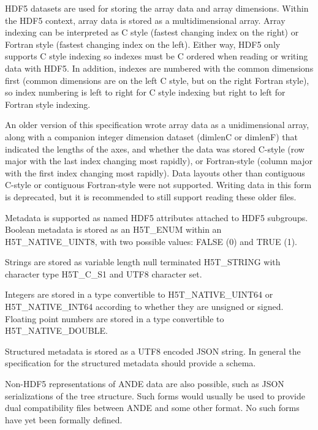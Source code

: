 \documentclass{article}
\begin{document}
HDF5 datasets are used for storing the array data and array dimensions. Within the HDF5 context, array data is stored as a multidimensional array. Array indexing can be interpreted as C style (fastest changing index on the right) or Fortran style (fastest changing index on the left). Either way, HDF5 only supports C style indexing so indexes must be C ordered when reading or writing data with HDF5. In addition, indexes are numbered with the common dimensions first (common dimensions are on the left C style, but on the right Fortran style), so index numbering is left to right for C style indexing but right to left for Fortran style indexing.  

An older version of this specification wrote array data as a unidimensional array, along with a companion integer dimension dataset (dimlenC or dimlenF) that indicated the lengths of the axes, and whether the data was stored C-style (row major with the last index changing most rapidly), or Fortran-style (column major with the first index changing most rapidly). Data layouts other than contiguous C-style or contiguous Fortran-style were not supported. Writing data in this form is deprecated, but it is recommended to still support reading these older files.  

Metadata is supported as named HDF5 attributes attached to HDF5 subgroups.
Boolean metadata is stored as an H5T\_ENUM within an H5T\_NATIVE\_UINT8, with two possible values: FALSE (0) and TRUE (1).

Strings are stored as variable length null terminated H5T\_STRING with character type H5T\_C\_S1 and UTF8 character set.

Integers are stored in a type convertible to H5T\_NATIVE\_UINT64 or H5T\_NATIVE\_INT64 according to whether they are unsigned or signed. Floating point numbers are stored in a type convertible to H5T\_NATIVE\_DOUBLE.

Structured metadata is stored as a UTF8 encoded JSON string. In general the specification for the structured metadata should provide a schema. 

Non-HDF5 representations of ANDE data are also possible, such as JSON serializations of the tree structure. Such forms would usually be used to provide dual compatibility files between ANDE and some other format. No such forms have yet been formally defined.
\end{document}
